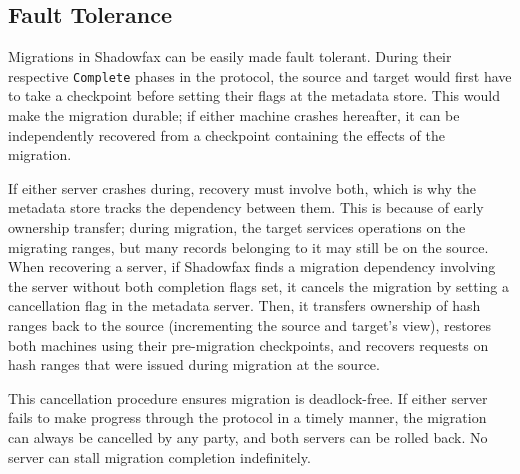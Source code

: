 \subsection{Fault Tolerance}
\label{sec:fault-tolerance}

Migrations in Shadowfax can be easily made fault tolerant.
%
During their
respective \texttt{Complete} phases in the protocol,
the source and target would first have to take a checkpoint before
setting their flags at the metadata store.
%
This would make the migration durable;
%
if either machine crashes hereafter, it can be independently recovered
from a checkpoint containing the effects of the migration.

If either server crashes during, recovery must involve both, which is why the
metadata store tracks the dependency between them.
%
This is because of early ownership transfer; during migration, the
target services operations on the migrating ranges, but many records belonging
to it may still be on the source.
%
When recovering a server, if Shadowfax finds a migration dependency
involving the server without both completion flags set, it cancels the
migration by setting a cancellation flag in the metadata server.
%
Then, it transfers ownership of hash ranges back to the source
(incrementing the source and target's view), restores both machines using
their pre-migration checkpoints, and recovers requests on hash
ranges that were issued during migration at the source.

This cancellation procedure ensures migration is deadlock-free.
%
If either server fails to make progress through the protocol
in a timely manner, the migration can always be cancelled by any party, and
both servers can be rolled back.
%
No server can stall migration completion indefinitely.

%
%
%
